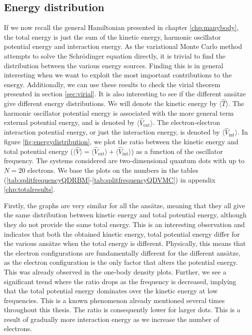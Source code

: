 \subsection{Energy distribution} \label{sec:energydistributions}
If we now recall the general Hamiltonian presented in chapter \ref{chp:manybody}, the total energy is just the sum of the kinetic energy, harmonic oscillator potential energy and interaction energy. As the variational Monte Carlo method attempts to solve the Schrödinger equation directly, it is trivial to find the distribution between the various energy sources. Finding this is in general interesting when we want to exploit the most important contributions to the energy. Additionally, we can use these results to check the virial theorem presented in section \ref{sec:virial}. It is also interesting to see if the different ansätze give different energy distributions. We will denote the kinetic energy by $\langle\hat{T}\rangle$. The harmonic oscillator potential energy is associated with the more general term external potential energy, and is denoted by $\langle\hat{V}_{\text{ext}}\rangle$. The electron-electron interaction potential energy, or just the interaction energy, is denoted by $\langle\hat{V}_{\text{int}}\rangle$. In figure \eqref{fig:energydistribution}, we plot the ratio between the kinetic energy and total potential energy ($\langle\hat{V}\rangle=\langle\hat{V}_{\text{ext}}\rangle+\langle\hat{V}_{\text{int}}\rangle$) as a function of the oscillator frequency. The systems considered are two-dimensional quantum dots with up to $N=20$ electrons. We base the plots on the numbers in the tables (\ref{tab:splitfrequencyQDRBM}-\ref{tab:splitfrequencyQDVMC}) in appendix \ref{chp:totalresults}.



Firstly, the graphs are very similar for all the ansätze, meaning that they all give the same distribution between kinetic energy and total potential energy, although they do not provide the same total energy. This is an interesting observation and indicates that both the obtained kinetic energy, total potential energy differ for the various ansätze when the total energy is different. Physically, this means that the electron configurations are fundamentally different for the different ansätze, as the electron configuration is the only factor that alters the potential energy. This was already observed in the one-body density plots. Further, we see a significant trend where the ratio drops as the frequency is decreased, implying that the total potential energy dominates over the kinetic energy at low frequencies. This is a known phenomenon already mentioned several times throughout this thesis. The ratio is consequently lower for larger dots. This is a result of gradually more interaction energy as we increase the number of electrons. 

